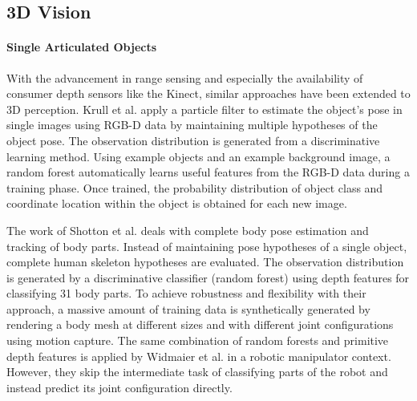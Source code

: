 \subsection{3D Vision}
\label{sec:3d_vision}

\paragraph{Single Articulated Objects}
With the advancement in range sensing and especially the availability of consumer depth sensors like the Kinect, similar approaches have been extended to 3D perception. Krull et al. \cite{Krull2015} apply a particle filter to estimate the object's pose in single images using RGB-D data by maintaining multiple hypotheses of the object pose. The observation distribution is generated from a discriminative learning method. Using example objects and an example background image, a random forest automatically learns useful features from the RGB-D data during a training phase. Once trained, the probability distribution of object class and coordinate location within the object is obtained for each new image.

The work of Shotton et al. \cite{Shotton2013} deals with complete body pose estimation and tracking of body parts. Instead of maintaining pose hypotheses of a single object, complete human skeleton hypotheses are evaluated. The observation distribution is generated by a discriminative classifier (random forest) using depth features for classifying 31 body parts. To achieve robustness and flexibility with their approach, a massive amount of training data is synthetically generated by rendering a body mesh at different sizes and with different joint configurations using motion capture.
The same combination of random forests and primitive depth features is applied by Widmaier et al. \cite{Widmaier2016} in a robotic manipulator context. However, they skip the intermediate task of classifying parts of the robot and instead predict its joint configuration directly.

